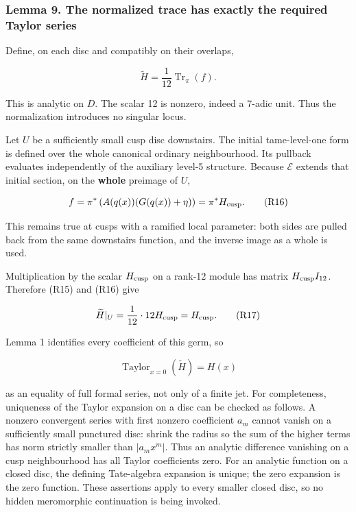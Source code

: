 \documentclass[11pt,a4paper]{article}
\begin{document}
\hypertarget{lemma-9.-the-normalized-trace-has-exactly-the-required-taylor-series}{%
\subsubsection{Lemma 9. The normalized trace has exactly the required Taylor series}\label{lemma-9.-the-normalized-trace-has-exactly-the-required-taylor-series}}

Define, on each disc and compatibly on their overlaps,

\[
\widetilde H=\frac1{12}\operatorname{Tr}_{\pi}(f).
\tag{R15}
\]

This is analytic on \(D\). The scalar 12 is nonzero, indeed a 7-adic unit. Thus the normalization introduces no singular locus.

Let \(U\) be a sufficiently small cusp disc downstairs. The initial tame-level-one form is defined over the whole canonical ordinary neighbourhood. Its pullback evaluates independently of the auxiliary level-5 structure. Because \(\mathcal E\) extends that initial section, on the \textbf{whole} preimage of \(U\),

\[
f=\pi^*\left(A(q(x))(G(q(x))+\eta)\right)=\pi^*H_{\rm cusp}.
\tag{R16}
\]

This remains true at cusps with a ramified local parameter: both sides are pulled back from the same downstairs function, and the inverse image as a whole is used.

Multiplication by the scalar \(H_{\rm cusp}\) on a rank-12 module has matrix \(H_{\rm cusp}I_{12}\). Therefore (R15) and (R16) give

\[
\widetilde H|_U=\frac1{12}\cdot12H_{\rm cusp}=H_{\rm cusp}.
\tag{R17}
\]

Lemma 1 identifies every coefficient of this germ, so

\[
\operatorname{Taylor}_{x=0}(\widetilde H)=H(x)
\]

as an equality of full formal series, not only of a finite jet. For completeness, uniqueness of the Taylor expansion on a disc can be checked as follows. A nonzero convergent series with first nonzero coefficient \(a_m\) cannot vanish on a sufficiently small punctured disc: shrink the radius so the sum of the higher terms has norm strictly smaller than \(|a_mx^m|\). Thus an analytic difference vanishing on a cusp neighbourhood has all Taylor coefficients zero. For an analytic function on a closed disc, the defining Tate-algebra expansion is unique; the zero expansion is the zero function. These assertions apply to every smaller closed disc, so no hidden meromorphic continuation is being invoked.
\end{document}

